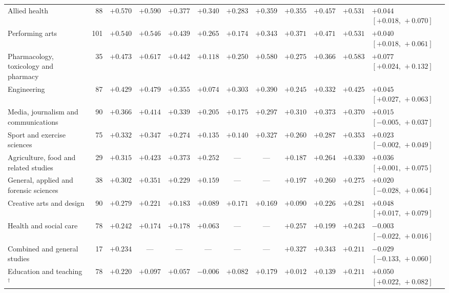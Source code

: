 \documentclass[11pt]{article}
\begin{document}
{\begin{longtable}{@{}>{\raggedright\arraybackslash}p{2.5cm}rcccccccccl@{}}
Allied health & 88 & ${+}0.570$ & ${+}0.590$ & ${+}0.377$ & ${+}0.340$ & ${+}0.283$ & ${+}0.359$ & ${+}0.355$ & ${+}0.457$ & ${+}0.531$ & ${+}0.044$ $[{+}0.018,\,{+}0.070]$ \\
Performing arts & 101 & ${+}0.540$ & ${+}0.546$ & ${+}0.439$ & ${+}0.265$ & ${+}0.174$ & ${+}0.343$ & ${+}0.371$ & ${+}0.471$ & ${+}0.531$ & ${+}0.040$ $[{+}0.018,\,{+}0.061]$ \\
Pharmacology, toxicology and pharmacy & 35 & ${+}0.473$ & ${+}0.617$ & ${+}0.442$ & ${+}0.118$ & ${+}0.250$ & ${+}0.580$ & ${+}0.275$ & ${+}0.366$ & ${+}0.583$ & ${+}0.077$ $[{+}0.024,\,{+}0.132]$ \\
Engineering & 87 & ${+}0.429$ & ${+}0.479$ & ${+}0.355$ & ${+}0.074$ & ${+}0.303$ & ${+}0.390$ & ${+}0.245$ & ${+}0.332$ & ${+}0.425$ & ${+}0.045$ $[{+}0.027,\,{+}0.063]$ \\
Media, journalism and communications & 90 & ${+}0.366$ & ${+}0.414$ & ${+}0.339$ & ${+}0.205$ & ${+}0.175$ & ${+}0.297$ & ${+}0.310$ & ${+}0.373$ & ${+}0.370$ & ${+}0.015$ $[{-}0.005,\,{+}0.037]$ \\
Sport and exercise sciences & 75 & ${+}0.332$ & ${+}0.347$ & ${+}0.274$ & ${+}0.135$ & ${+}0.140$ & ${+}0.327$ & ${+}0.260$ & ${+}0.287$ & ${+}0.353$ & ${+}0.023$ $[{-}0.002,\,{+}0.049]$ \\
Agriculture, food and related studies & 29 & ${+}0.315$ & ${+}0.423$ & ${+}0.373$ & ${+}0.252$ & --- & --- & ${+}0.187$ & ${+}0.264$ & ${+}0.330$ & ${+}0.036$ $[{+}0.001,\,{+}0.075]$ \\
General, applied and forensic sciences & 38 & ${+}0.302$ & ${+}0.351$ & ${+}0.229$ & ${+}0.159$ & --- & --- & ${+}0.197$ & ${+}0.260$ & ${+}0.275$ & ${+}0.020$ $[{-}0.028,\,{+}0.064]$ \\
Creative arts and design & 90 & ${+}0.279$ & ${+}0.221$ & ${+}0.183$ & ${+}0.089$ & ${+}0.171$ & ${+}0.169$ & ${+}0.090$ & ${+}0.226$ & ${+}0.281$ & ${+}0.048$ $[{+}0.017,\,{+}0.079]$ \\
Health and social care & 78 & ${+}0.242$ & ${+}0.174$ & ${+}0.178$ & ${+}0.063$ & --- & --- & ${+}0.257$ & ${+}0.199$ & ${+}0.243$ & ${-}0.003$ $[{-}0.022,\,{+}0.016]$ \\
Combined and general studies & 17 & ${+}0.234$ & --- & --- & --- & --- & --- & ${+}0.327$ & ${+}0.343$ & ${+}0.211$ & ${-}0.029$ $[{-}0.133,\,{+}0.060]$ \\
Education and teaching$^\dagger$ & 78 & ${+}0.220$ & ${+}0.097$ & ${+}0.057$ & ${-}0.006$ & ${+}0.082$ & ${+}0.179$ & ${+}0.012$ & ${+}0.139$ & ${+}0.211$ & ${+}0.050$ $[{+}0.022,\,{+}0.082]$ \\

\end{longtable}}
\end{document}
